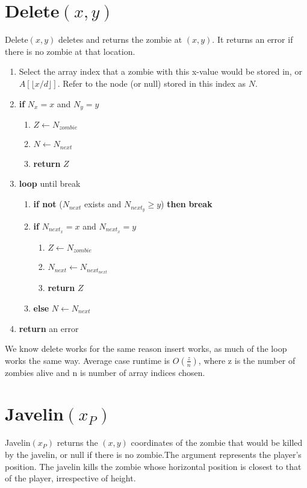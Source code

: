 \documentclass{article}
\begin{document}
\section{Delete$(x,y)$}
Delete$(x,y)$  deletes  and  returns  the  zombie  at  $(x,y)$.  It  returns an error if there is no zombie at that location. 
\begin{enumerate}
    \item Select the array index that a zombie with this x-value would be stored in, or $A[\lfloor x/d \rfloor]$. Refer to the node (or null) stored in this index as $N$.
    \item \textbf{if} $N_x = x$ and $N_y = y$
    \begin{enumerate}
        \item $Z \leftarrow N_{zombie}$
        \item $N \leftarrow N_{next}$
        \item \textbf{return} $Z$
    \end{enumerate}
    \item \textbf{loop} until break
    \begin{enumerate}
        \item \textbf{if not} ($N_{next}$ exists and $N_{next_y}\geq y$) \textbf{then} \textbf{break}
        \item \textbf{if} $N_{next_x} = x$ and $N_{next_x} = y$
        \begin{enumerate}
            \item $Z \leftarrow N_{zombie}$
            \item $N_{next} \leftarrow N_{next_{next}}$
            \item \textbf{return} $Z$
        \end{enumerate}
        \item \textbf{else} $N \leftarrow N_{next}$
    \end{enumerate}
    \item \textbf{return} an error
\end{enumerate}
We know delete works for the same reason insert works, as much of the loop works the same way. Average case runtime is $O(\frac{z}{n})$, where z is the number of zombies alive and n is number of array indices chosen.

\section{Javelin$(x_P)$}
Javelin$(x_P)$ returns the $(x,y)$ coordinates of the zombie that would be killed by the javelin, or null if there is no zombie.The argument represents the player’s position. The javelin  kills  the  zombie  whose  horizontal  position  is  closest to that of the player, irrespective of height. 
\end{document}
